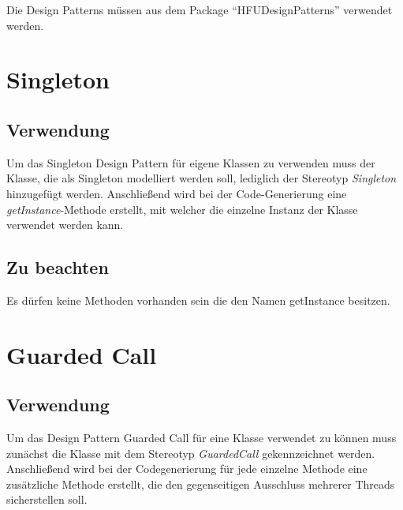 Die Design Patterns müssen aus dem Package \enquote{HFUDesignPatterns} verwendet werden.

\section{Singleton}

\subsection{Verwendung}

Um das Singleton Design Pattern für eigene Klassen zu verwenden muss der Klasse, die als Singleton modelliert werden soll, lediglich der Stereotyp \textit{Singleton} hinzugefügt werden. Anschließend wird bei der Code-Generierung eine \textit{getInstance}-Methode erstellt, mit welcher die einzelne Instanz der Klasse verwendet werden kann.

\subsection{Zu beachten}

Es dürfen keine Methoden vorhanden sein die den Namen getInstance besitzen.\\


\section{Guarded Call}

\subsection{Verwendung}
Um das Design Pattern Guarded Call für eine Klasse verwendet zu können muss zunächst die Klasse mit dem Stereotyp \textit{GuardedCall} gekennzeichnet werden. Anschließend wird bei der Codegenerierung für jede einzelne Methode eine zusätzliche Methode erstellt, die den gegenseitigen Ausschluss mehrerer Threads sicherstellen soll.

